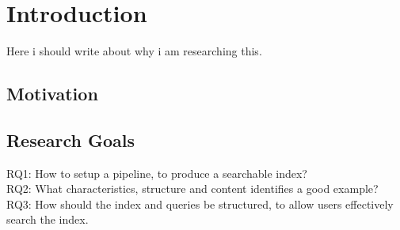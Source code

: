 
\chapter{Introduction}

Here i should write about why i am researching this.

\section{Motivation}

\section{Research Goals}

RQ1: How to setup a pipeline, to produce a searchable index?\\
RQ2: What characteristics, structure and content identifies a good example?\\
RQ3: How should the index and queries be structured, to allow users effectively search the index.\\



\cleardoublepage